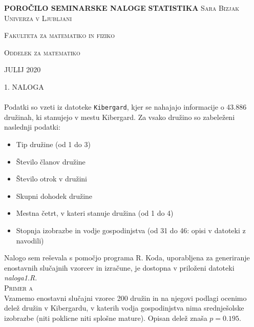\documentclass[a4paper,12pt]{article}
\begin{document}
\begin{titlepage}
    \centering
    \vfill
    \vfill
    \textbf{\large{POROČILO SEMINARSKE NALOGE}}
    \vfill
    \textbf{\Huge{STATISTIKA}}
    \vfill\vfill\vfill\vfill\vfill
    \textsc{\Large{Sara Bizjak}}
    \vfill\vfill
    \textsc{\large{Univerza v Ljubljani}}
    
    \textsc{\large{Fakulteta za matematiko in fiziko}}
    
    \textsc{\large{Oddelek za matematiko}}
    \vfill\vfill
        
    \large{JULIJ 2020}
    
\end{titlepage}


\newpage


\noindent
\textsc{\large{1. NALOGA}}
\\
\\
Podatki so vzeti iz datoteke \texttt{Kibergard}, kjer se nahajajo informacije o 43.886 družinah, ki stanujejo v mestu Kibergard. Za vsako družino so zabeleženi naslednji podatki:
\begin{itemize}
    \item Tip družine (od 1 do 3)
    \item Število članov družine
    \item Število otrok v družini
    \item Skupni dohodek družine
    \item Mestna četrt, v kateri stanuje družina (od 1 do 4)
    \item Stopnja izobrazbe in vodje gospodinjstva (od 31 do 46: opisi v datoteki z navodili)
\end{itemize}

\noindent
Nalogo sem reševala s pomočjo programa R. Koda, uporabljena za generiranje enostavnih slučajnih vzorcev in izračune, je dostopna v priloženi datoteki \textit{naloga1.R}. 
\\


\noindent
\textsc{Primer a}
\\
Vzamemo enostavni slučajni vzorec 200 družin in na njegovi podlagi ocenimo delež družin v Kibergardu, v katerih vodja gospodinjstva nima srednješolske izobrazbe (niti poklicne niti splošne mature).
Opisan delež znaša $p = 0.195$.
\\
\end{document}
